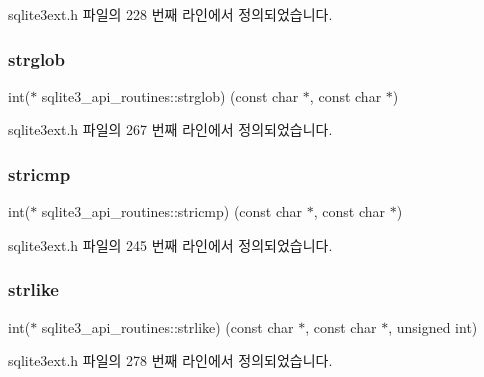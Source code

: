 sqlite3ext.\+h 파일의 228 번째 라인에서 정의되었습니다.

\mbox{\label{structsqlite3__api__routines_ac45b5832c7bfe7e61cdaaea05aa88f00}} 
\subsubsection{\texorpdfstring{strglob}{strglob}}
{\footnotesize\ttfamily int($\ast$ sqlite3\+\_\+api\+\_\+routines\+::strglob) (const char $\ast$, const char $\ast$)}



sqlite3ext.\+h 파일의 267 번째 라인에서 정의되었습니다.

\mbox{\label{structsqlite3__api__routines_aa6c2af28787384ae1f266ba2d7d97972}} 
\subsubsection{\texorpdfstring{stricmp}{stricmp}}
{\footnotesize\ttfamily int($\ast$ sqlite3\+\_\+api\+\_\+routines\+::stricmp) (const char $\ast$, const char $\ast$)}



sqlite3ext.\+h 파일의 245 번째 라인에서 정의되었습니다.

\mbox{\label{structsqlite3__api__routines_aeb83edd8809c64405e7a4546721a6d07}} 
\subsubsection{\texorpdfstring{strlike}{strlike}}
{\footnotesize\ttfamily int($\ast$ sqlite3\+\_\+api\+\_\+routines\+::strlike) (const char $\ast$, const char $\ast$, unsigned int)}



sqlite3ext.\+h 파일의 278 번째 라인에서 정의되었습니다.

